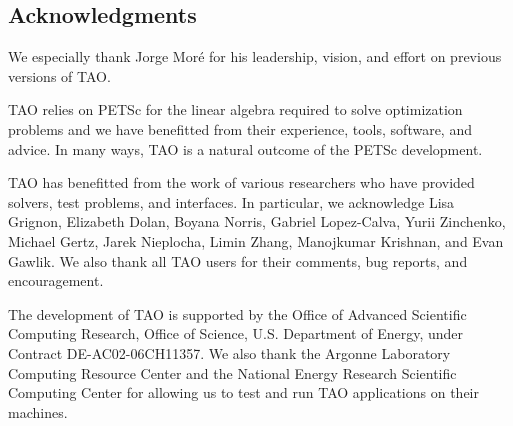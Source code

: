 %
%

\subsection*{Acknowledgments}

We especially thank Jorge Mor\'e for his leadership, vision, and effort on 
previous versions of TAO.  

TAO relies on PETSc for the linear algebra required to solve optimization
problems and we have benefitted from their experience, tools, software, 
and advice. In many ways, TAO is a natural outcome of the PETSc 
development.  

TAO has benefitted from the work of various researchers who have provided 
solvers, test problems, and interfaces.  In particular, we acknowledge Lisa 
Grignon, Elizabeth Dolan, Boyana Norris, Gabriel Lopez-Calva, Yurii Zinchenko, 
Michael Gertz, Jarek Nieplocha, Limin Zhang, Manojkumar Krishnan, and Evan 
Gawlik.  We also thank all TAO users for their comments, bug reports, and 
encouragement.

The development of TAO is supported by the Office of Advanced Scientific 
Computing Research, Office of Science, U.S. Department of Energy, under 
Contract DE-AC02-06CH11357.  We also thank the Argonne Laboratory Computing 
Resource Center and the National Energy Research Scientific Computing Center 
for allowing us to test and run TAO applications on their machines.

